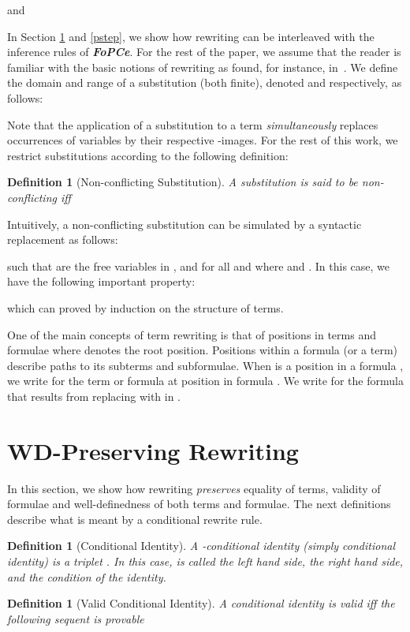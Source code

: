 \documentclass[copyright]{eptcs}
\newtheorem{definition}[theorem]{Definition}
\begin{document}
and

\par
In Section \ref{wdpres} and \ref{pstep}, we show how rewriting can be interleaved with the inference rules of \textbf{\textit{FoPCe}}. For the rest of the paper, we assume that the reader is familiar with the basic notions of rewriting as found, for instance, in~\cite{280474}. We define the domain and range of a substitution  (both finite), denoted  and  respectively, as follows:

Note that the application of a substitution  to a term  \textit{simultaneously} replaces occurrences of variables by their respective -images. For the rest of this work, we restrict substitutions according to the following definition:
\begin{definition}[Non-conflicting Substitution]
A substitution  is said to be non-conflicting iff

\end{definition}
Intuitively, a non-conflicting substitution can be simulated by a syntactic replacement as follows:

such that  are the free variables in , and  for all  and  where  and . In this case, we have the following important property:

which can proved by induction on the structure of terms.
\par
One of the main concepts of term rewriting is that of positions in terms and formulae where  denotes the root position. Positions within a formula (or a term) describe paths to its subterms and subformulae. When  is a position in a formula , we write  for the term or formula at position  in formula . We write  for the formula that results from replacing  with  in . 
\section{WD-Preserving Rewriting}\label{wdpres}
In this section, we show how rewriting \textit{preserves} equality of terms, validity of formulae and well-definedness of both terms and formulae. The next definitions describe what is meant by a conditional rewrite rule.

\begin{definition}[Conditional Identity]
A -conditional identity (simply conditional identity) is a triplet . In this case,  is called the left hand side,  the right hand side, and  the condition of the identity.
\end{definition}

\begin{definition}[Valid Conditional Identity]\label{validCI}
A conditional identity  is valid iff the following sequent is provable

\end{definition}
\end{document}
